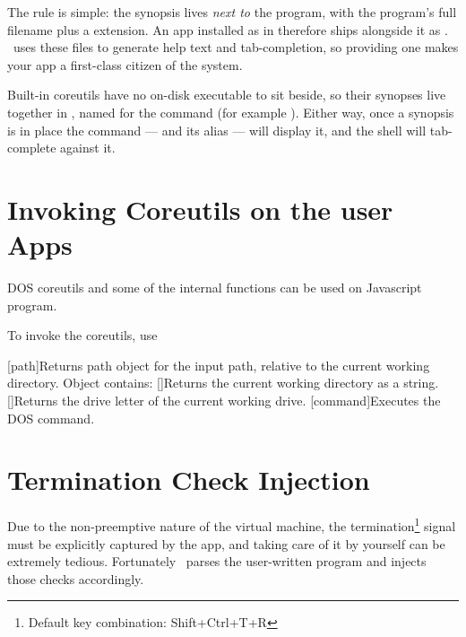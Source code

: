 The rule is simple: the synopsis lives \emph{next to} the program, with the program's full filename plus a  extension. An app installed as  in  therefore ships alongside it as . \thedos\ uses these files to generate help text and tab-completion, so providing one makes your app a first-class citizen of the system.

Built-in coreutils have no on-disk executable to sit beside, so their synopses live together in , named for the command (for example ). Either way, once a synopsis is in place the  command --- and its  alias --- will display it, and the shell will tab-complete against it.


\section{Invoking Coreutils on the user Apps}

DOS coreutils and some of the internal functions can be used on Javascript program.

To invoke the coreutils, use 

\begin{outline}
\1[path]{Returns path object for the input path, relative to the current working directory. Object contains:}
 \2
 \2
 \2
 \2
\1[]{Returns the current working directory as a string.}
\1[]{Returns the drive letter of the current working drive.}
\1[command]{Executes the DOS command.}
\end{outline}


\section{Termination Check Injection}

Due to the non-preemptive nature of the virtual machine, the termination\footnote{Default key combination: Shift+Ctrl+T+R} signal must be explicitly captured by the app, and taking care of it by yourself can be extremely tedious. Fortunately \thedos\ parses the user-written program and injects those checks accordingly.

